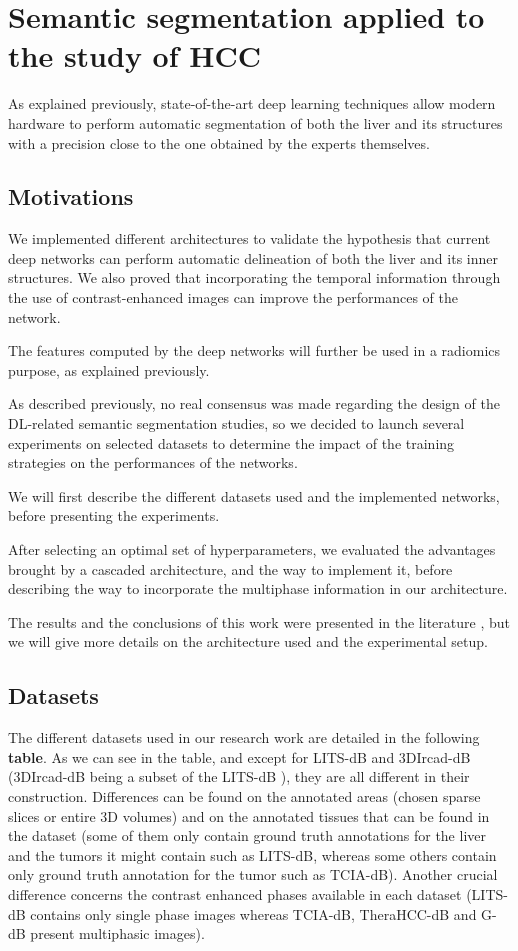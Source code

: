 \documentclass[]{article}
\begin{document}
\section*{Semantic segmentation applied to the study of HCC}

As explained previously, state-of-the-art deep learning techniques allow
modern hardware to perform automatic segmentation of both the liver and
its structures with a precision close to the one obtained by the experts
themselves.


\subsection*{Motivations}

We implemented different architectures to validate the hypothesis that
current deep networks can perform automatic delineation of both the
liver and its inner structures. We also proved that incorporating the temporal information through the use of contrast-enhanced images can improve the performances of the network.

The features computed by the deep networks will further be used in a
radiomics purpose, as explained previously.

As described previously, no real consensus was made regarding the
design of the DL-related semantic segmentation studies, so we decided to
launch several experiments on selected datasets to determine the impact
of the training strategies on the performances of the networks.

We will first describe the different datasets used and the implemented
networks, before presenting the experiments.

After selecting an optimal set of hyperparameters, we evaluated the
advantages brought by a cascaded architecture, and the way to implement
it, before describing the way to incorporate the multiphase information
in our architecture.

The results and the conclusions of this work were presented in the
literature \cite{Ouhmich2019}, but we will give more details on the
architecture used and the experimental setup.



\subsection*{Datasets}

The different datasets used in our research work are detailed in the
following \textbf{table}.
As we can see in the table, and except for LITS-dB and 3DIrcad-dB
(3DIrcad-dB being a subset of the LITS-dB \cite{Bilic2019}), they are all different in their construction. Differences can
be found on the annotated areas (chosen sparse slices or entire 3D
volumes) and on the annotated tissues that can be found in the dataset
(some of them only contain ground truth annotations for the liver and
the tumors it might contain such as LITS-dB, whereas some others contain
only ground truth annotation for the tumor such as TCIA-dB). Another
crucial difference concerns the contrast enhanced phases available in
each dataset (LITS-dB contains only single phase images whereas TCIA-dB,
TheraHCC-dB and G-dB present multiphasic images).
\end{document}
